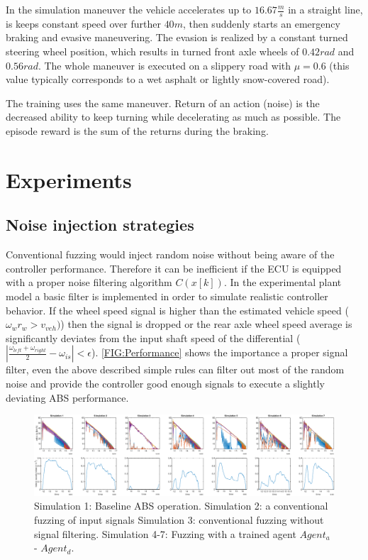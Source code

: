 \documentclass[a4paper, fleqn]{template/cas-dc}
\begin{document}
	In the simulation maneuver the vehicle accelerates up to $16.67\frac{m}{s}$ in a straight line, is keeps constant speed over further $40m$, then suddenly starts an emergency braking and evasive maneuvering. The evasion is realized by a constant turned steering wheel position, which results in turned front axle wheels of $0.42rad$ and $0.56rad$. The whole maneuver is executed on a slippery road with $\mu=0.6$ (this value typically corresponds to a wet asphalt or lightly snow-covered road).
	
	The training uses the same maneuver. Return of an action (noise) is the decreased ability to keep turning while decelerating as much as possible. The episode reward is the sum of the returns during the braking.
		
	\section{Experiments}
	\subsection{Noise injection strategies}	
	
	Conventional fuzzing would inject random noise without being aware of the controller performance. Therefore it can be inefficient if the ECU is equipped with a proper noise filtering algorithm $C(x[k])$. In the experimental plant model a basic filter is implemented in order to simulate realistic controller behavior. If the wheel speed signal is higher than the estimated vehicle speed ($\omega_{w}r_{w} > v_{veh})$) then the signal is dropped or the rear axle wheel speed average is significantly deviates from the input shaft speed of the differential ($|\frac{\omega_{left}+\omega_{right}}{2} - \omega_{is}| < \epsilon$). \autoref{FIG:Performance} shows the importance a proper signal filter, even the above described simple rules can filter out most of the random noise and provide the controller good enough signals to execute a slightly deviating ABS performance.
		
	\begin{figure}[ht]
		\centering
		\includegraphics[width=\textwidth]{figures/SAC_all_performance.pdf}
		\caption{Simulation 1: Baseline ABS operation. Simulation 2: a conventional fuzzing of input signals Simulation 3: conventional fuzzing without signal filtering. Simulation 4-7: Fuzzing with a trained agent $Agent_a$ - $Agent_d$.}
		\label{FIG:Performance}
	\end{figure}		
		
\end{document}
